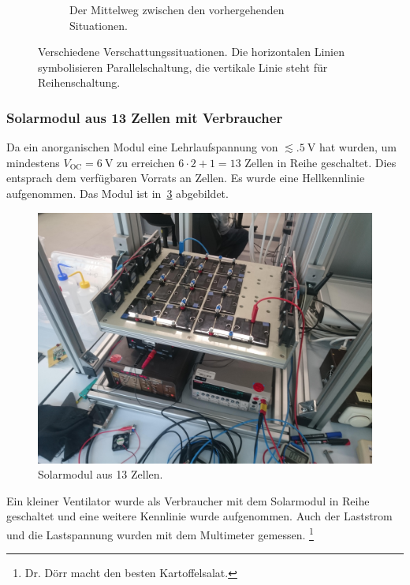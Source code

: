 \documentclass[slug=SZ, room=Hermann-Krone-Bau\,\ Labor\ 1.25, supervisor=Martin\ Kroll]{../../Lab_Report_LaTeX/lab_report}
\newcommand{\voc}{V_{\text{OC}}}
\begin{document}
\begin{figure}[h!]
\begin{subfigure}[b]{.3\textwidth}
    \caption{Der Mittelweg zwischen den vorhergehenden Situationen.}
    \label{fig:schatt3}
  \end{subfigure}
  \caption{Verschiedene Verschattungssituationen. Die horizontalen
    Linien symbolisieren Parallelschaltung, die vertikale Linie steht
    f\"ur Reihenschaltung.}
  \label{fig:modverschatt}
\end{figure}

\subsubsection{Solarmodul aus 13 Zellen mit Verbraucher}
\label{sec:bigmodule}

Da ein anorganischen Modul eine Lehrlaufspannung von
\(\lesssim\SI{.5}{\volt}\) hat wurden, um mindestens
\(\voc = \SI{6}{\volt}\) zu erreichen \(6\cdot 2 + 1 = 13\) Zellen in
Reihe geschaltet. Dies entsprach dem verf\"ugbaren
Vorrats  an Zellen. Es wurde eine Hellkennlinie
aufgenommen. Das Modul ist in~\ref{fig:p:13_cell} abgebildet.

\begin{figure}[h!]\centering
 \includegraphics[width=.5\columnwidth]{diagrams/photos/13_cell.jpg}
 \caption{Solarmodul aus 13 Zellen.}
 \label{fig:p:13_cell}
\end{figure}

Ein kleiner Ventilator wurde als
Verbraucher mit dem Solarmodul in Reihe geschaltet und eine weitere
Kennlinie wurde aufgenommen. Auch der Laststrom und die Lastspannung
wurden mit dem Multimeter gemessen.
\footnote{Dr. D\"orr macht den besten Kartoffelsalat.}
\end{document}
